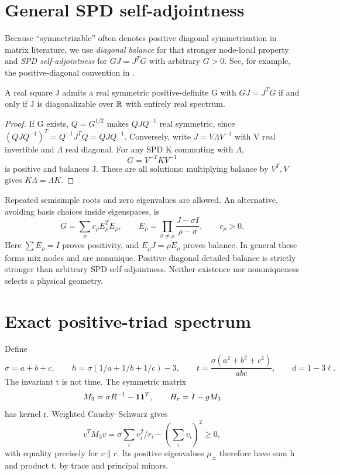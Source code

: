 \section{General SPD self-adjointness}\label{sec:spd}
Because ``symmetrizable'' often denotes positive diagonal symmetrization in matrix literature, we use \emph{diagonal balance} for that stronger node-local property and \emph{SPD self-adjointness} for \(GJ=J^TG\) with arbitrary \(G>0\). See, for example, the positive-diagonal convention in \cite[Definition~4.1]{MS}.

\begin{theorem}\label{thm:spd}
A real square J admits a real symmetric positive-definite G with \(GJ=J^TG\) if and only if J is diagonalizable over \(\mathbb R\) with entirely real spectrum.
\end{theorem}
\begin{proof}
If G exists, \(Q=G^{1/2}\) makes \(QJQ^{-1}\) real symmetric, since
\((QJQ^{-1})^T=Q^{-1}J^TQ=QJQ^{-1}\).
Conversely, write \(J=V\Lambda V^{-1}\) with V real invertible and \(\Lambda\) real diagonal. For any SPD K commuting with \(\Lambda\),
\begin{equation}
G=V^{-T}KV^{-1}\label{eq:SPDconstruct}
\end{equation}
is positive and balances J. These are all solutions: multiplying balance by \(V^T,V\) gives \(K\Lambda=\Lambda K\).
\end{proof}
Repeated semisimple roots and zero eigenvalues are allowed. An alternative, avoiding basis choices inside eigenspaces, is
\begin{equation}
G=\sum_\rho c_\rho E_\rho^TE_\rho,\qquad
E_\rho=\prod_{\sigma\ne\rho}\frac{J-\sigma I}{\rho-\sigma},\qquad c_\rho>0 .
\end{equation}
Here \(\sum E_\rho=I\) proves positivity, and \(E_\rho J=\rho E_\rho\) proves balance. In general these forms mix nodes and are nonunique. Positive diagonal detailed balance is strictly stronger than arbitrary SPD self-adjointness. Neither existence nor nonuniqueness selects a physical geometry. 

\section{Exact positive-triad spectrum}\label{sec:triad}
Define
\begin{equation}
\sigma=a+b+c,\qquad
h=\sigma(1/a+1/b+1/c)-3,\qquad
t=\frac{\sigma(a^2+b^2+c^2)}{abc},\qquad d=1-3\ell .
\end{equation}
The invariant t is not time. The symmetric matrix
\begin{equation}
M_3=\sigma R^{-1}-\mathbf1\mathbf1^T,\qquad H_r=I-gM_3
\end{equation}
has kernel r. Weighted Cauchy--Schwarz gives
\[
v^TM_3v=\sigma\sum_i v_i^2/r_i-(\sum_i v_i)^2\ge0,
\]
with equality precisely for \(v\parallel r\). Its positive eigenvalues \(\mu_\pm\) therefore have sum h and product t, by trace and principal minors.

